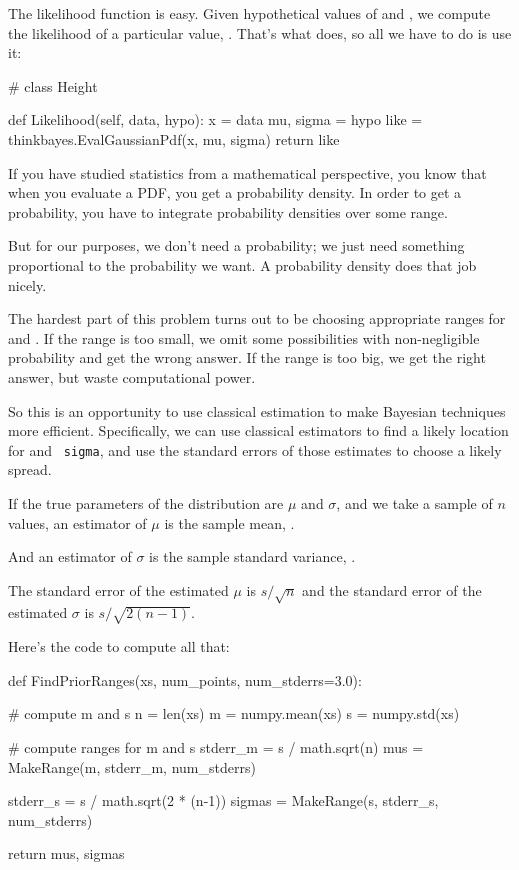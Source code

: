 \documentclass[12pt]{book}
\theoremstyle{exercise}
\begin{document}
The likelihood function is easy.  Given hypothetical values
of  and , we compute the likelihood
of a particular value, .  That's what 
does, so all we have to do is use it:

\begin{code}
# class Height

    def Likelihood(self, data, hypo):
        x = data
        mu, sigma = hypo
        like = thinkbayes.EvalGaussianPdf(x, mu, sigma)
        return like
\end{code}

If you have studied statistics from a mathematical perspective,
you know that when you evaluate a PDF, you get a probability
density.  In order to get a probability, you have to integrate
probability densities over some range.

But for our purposes, we don't need a probability; we just
need something proportional to the probability we want.
A probability density does that job nicely.

The hardest part of this problem turns
out to be choosing appropriate ranges for  and
.  If the range is too small, we omit some
possibilities with non-negligible probability and get the
wrong answer.  If the range is too big, we get the right answer,
but waste computational power.

So this is an opportunity to use classical estimation to
make Bayesian techniques more efficient.  Specifically, we can use
classical estimators to find a likely location for  and {\tt
  sigma}, and use the standard errors of those estimates to choose a
likely spread.

If the true parameters of the distribution are $\mu$ and $\sigma$, and
we take a sample of $n$ values, an estimator of $\mu$ is the sample
mean, .

And an estimator of $\sigma$ is the sample standard
variance, .

The standard error of the estimated $\mu$ is $s / \sqrt{n}$
and the standard error of the estimated $\sigma$ is
$s / \sqrt{2 (n-1)}$.

Here's the code to compute all that:

\begin{code}
def FindPriorRanges(xs, num_points, num_stderrs=3.0):

    # compute m and s
    n = len(xs)
    m = numpy.mean(xs)
    s = numpy.std(xs)

    # compute ranges for m and s
    stderr_m = s / math.sqrt(n)
    mus = MakeRange(m, stderr_m, num_stderrs)

    stderr_s = s / math.sqrt(2 * (n-1))
    sigmas = MakeRange(s, stderr_s, num_stderrs)

    return mus, sigmas
\end{code}
\end{document}
